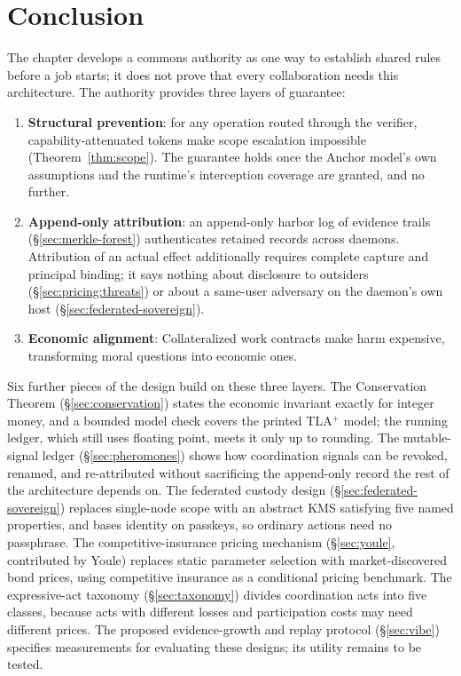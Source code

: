 \documentclass[11pt,a4paper]{article}
\theoremstyle{definition}
\theoremstyle{remark}
\begin{document}
\section{Conclusion}

The chapter develops a commons authority as one way to establish shared
rules before a job starts; it does not prove that every collaboration needs
this architecture. The authority provides three layers of guarantee:

\begin{enumerate}[nosep]
  \item \textbf{Structural prevention}: for any operation routed through the verifier, capability-attenuated tokens make scope escalation impossible (Theorem~\ref{thm:scope}). The guarantee holds once the Anchor model's own assumptions and the runtime's interception coverage are granted, and no further.
  \item \textbf{Append-only attribution}: an append-only harbor log of evidence trails (\S\ref{sec:merkle-forest}) authenticates retained records across daemons. Attribution of an actual
effect additionally requires complete capture and principal binding; it says nothing about disclosure to outsiders (\S\ref{sec:pricing:threats}) or about a same-user adversary on the daemon's own host (\S\ref{sec:federated-sovereign}).
  \item \textbf{Economic alignment}: Collateralized work contracts make harm expensive, transforming moral questions into economic ones.
\end{enumerate}

Six further pieces of the design build on these three layers. The Conservation Theorem (\S\ref{sec:conservation}) states the economic invariant exactly for integer money, and a bounded model check covers the printed TLA$^{+}$ model; the running ledger, which still uses floating point, meets it only up to rounding. The mutable-signal ledger (\S\ref{sec:pheromones}) shows how coordination signals can be revoked, renamed, and re-attributed without sacrificing the append-only record the rest of the architecture depends on. The federated custody design (\S\ref{sec:federated-sovereign}) replaces single-node scope with an abstract KMS satisfying five named properties, and bases identity on passkeys, so ordinary actions need no passphrase. The competitive-insurance pricing mechanism (\S\ref{sec:youle}, contributed by Youle) replaces static parameter selection with market-discovered bond prices, using competitive insurance as a conditional pricing benchmark. The expressive-act taxonomy (\S\ref{sec:taxonomy}) divides coordination acts into five classes, because acts with different losses and participation costs may need different prices. The proposed evidence-growth and replay protocol (\S\ref{sec:vibe}) specifies measurements for evaluating these designs; its utility remains to be tested.
\end{document}

